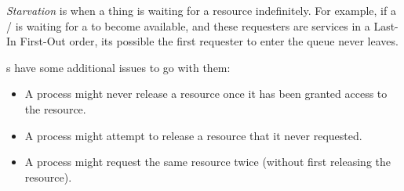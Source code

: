 \begin{definition}[Starvation]\label{def:Starvation}
  \emph{Starvation} is when a thing is waiting for a resource indefinitely.
  For example, if a / is waiting for a  to become available, and these requesters are services in a Last-In First-Out order, its possible the first requester to enter the queue never leaves.
\end{definition}

s have some additional issues to go with them:
\begin{itemize}[noitemsep]
\item A process might never release a resource once it has been granted access to the resource.
\item A process might attempt to release a resource that it never requested.
\item A process might request the same resource twice (without first releasing the resource).
\end{itemize}

